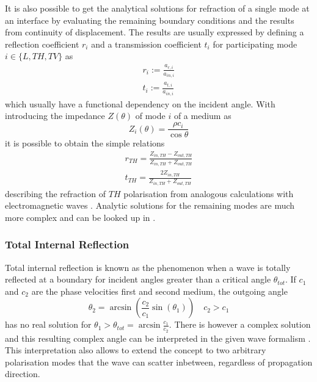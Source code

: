 
It is also possible to get the analytical solutions for refraction of a single
mode at an interface by evaluating the remaining boundary conditions and the
results from continuity of displacement. The results are usually expressed by
defining a reflection coefficient $r_i$ and a transmission coefficient $t_i$
for participating mode $i \in\{L, TH, TV\}$ as
\begin{align}
    r_i := \frac{a_{r,i}}{a_{in,i}} \\
    t_i := \frac{a_{t,i}}{a_{in,i}}
\end{align}
which usually have a functional dependency on the incident angle. With
introducing the impedance $Z(\theta)$ of mode $i$ of a medium as
\begin{equation}
    Z_i(\theta ) = \frac{\rho c_i}{\cos\theta}
\end{equation}
it is possible to obtain the simple relations
\begin{align} \label{eq:theoSingleTH}
    r_{TH} = \frac{Z_{in,TH}-Z_{out,TH}}{Z_{in,TH}+Z_{out,TH}} \\
    t_{TH} = \frac{2 Z_{in,TH}}{Z_{in,TH}+Z_{out,TH}}
\end{align}
describing the refraction of $TH$ polarisation from analogous calculations
with electromagnetic waves \cite[46,14]{brekhovskikh2012waves}. Analytic
solutions for the remaining modes are much more complex and can be looked up in
\cite[83]{ewing1957elastic}.

\subsubsection{Total Internal Reflection}
Total internal reflection is known as the phenomenon when a wave is totally
reflected at a boundary for incident angles greater than a critical angle
$\theta_{tot}$. If $c_1$ and $c_2$ are the phase velocities first and second
medium, the outgoing angle
\begin{equation}
    \theta_2 = \arcsin( \frac{c_2}{c_1} \sin(\theta_1)) \quad c_2 > c_1
\end{equation}
has no real solution for $\theta_1 > \theta_{tot} = \arcsin \frac{c_1}{c_2}$.
There is however a complex solution and this resulting complex angle can be
interpreted in the given wave formalism \cite[5]{brekhovskikh2012waves}. This
interpretation also allows to extend the concept to two arbitrary polarisation
modes that the wave can scatter inbetween, regardless of propagation direction.

